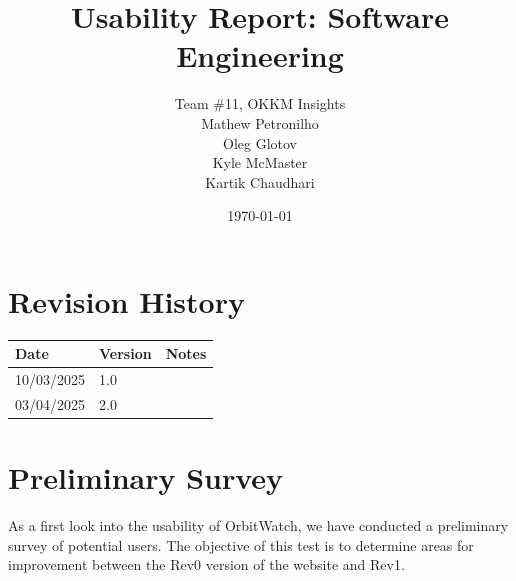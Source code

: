 \documentclass[12pt, titlepage]{article}
\begin{document}
\title{Usability Report: Software Engineering} 
\author{Team \#11, OKKM Insights\\
Mathew Petronilho\\
Oleg Glotov\\
Kyle McMaster\\
Kartik Chaudhari}
\date{\today}
	
\maketitle


\section{Revision History}

\begin{tabularx}{\textwidth}{p{3cm}p{2cm}X}
\toprule {\bf Date} & {\bf Version} & {\bf Notes}\\
\midrule
10/03/2025 & 1.0  &\\
03/04/2025 & 2.0  &\\
\bottomrule
\end{tabularx}


\tableofcontents

\section{Preliminary Survey}
As a first look into the usability of OrbitWatch, we have conducted a preliminary survey of potential users. The objective of this test is to determine areas for improvement between the Rev0 version of the website and Rev1.
\end{document}
